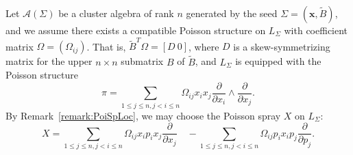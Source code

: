 \documentclass{amsart}
\numberwithin{equation}{section}
\newcommand{\bfx}{\mathbf{x}}
\newcommand{\cA}{\mathcal{A}}
\begin{document}
Let $\cA(\Sigma)$ be a cluster algebra of rank $n$ generated by the seed $\Sigma=(\bfx,\tilde B)$, and we assume there exists a compatible Poisson structure on $L_\Sigma$ with coefficient matrix $\Omega=(\Omega_{ij})$. That is,  $\tilde B^T\Omega=[D\ 0]$, where $D$ is a skew-symmetrizing matrix for the upper $n\times n$ submatrix $B$ of $\tilde B$, and $L_\Sigma$ is equipped with the Poisson structure
\begin{equation}
	\pi=\sum\limits_{1 \leq j \leq n, j < i \leq n}\Omega_{ij}x_ix_j\frac{\partial}{\partial x_i}\wedge\frac{\partial}{\partial x_j}.
\end{equation}
By Remark~\ref{remark:PoiSpLoc}, we may choose the Poisson spray $X$ on $L_\Sigma$:
\begin{equation}
	X = \sum\limits_{1 \leq j \leq n, j < i \leq n}\Omega_{ij}x_ip_i x_j\frac{\partial}{\partial x_j} \quad - \sum\limits_{1 \leq j \leq n, j < i \leq n}\Omega_{ij}p_ix_i p_j\frac{\partial}{\partial p_j}.
\end{equation}



\end{document}
